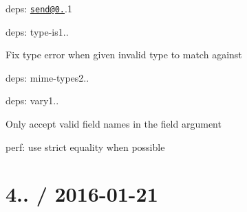 \begin{DoxyItemize}
\begin{DoxyItemize}
\item deps\+: \href{mailto:send@0.14}{\tt send@0.}.1
\end{DoxyItemize}
\item deps\+: type-\/is1..
\begin{DoxyItemize}
\item Fix type error when given invalid type to match against
\item deps\+: mime-\/types2..
\end{DoxyItemize}
\item deps\+: vary1..
\begin{DoxyItemize}
\item Only accept valid field names in the {\ttfamily field} argument
\end{DoxyItemize}
\item perf\+: use strict equality when possible
\end{DoxyItemize}

\section*{4.. / 2016-\/01-\/21 }


